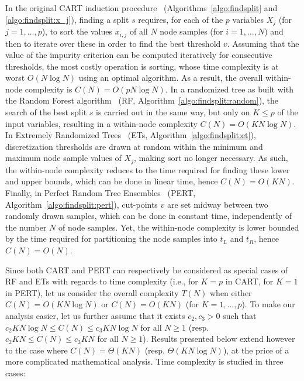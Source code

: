 In the original CART induction procedure~\citep{breiman:1984}
(Algorithms~\ref{algo:findsplit} and \ref{algo:findsplit:x_j}), finding a split
$s$  requires, for each of the $p$ variables $X_j$ (for $j=1,\dots,p$), to sort
the values $x_{i,j}$ of all $N$ node samples (for $i=1,\dots,N$) and then to
iterate over these in order to find the best threshold $v$. Assuming that the
value of the impurity criterion can be computed iteratively for consecutive
thresholds, the most costly operation
is sorting, whose time complexity is at worst $O(N \log N)$ using an optimal algorithm. As a result, the
overall within-node complexity is $C(N) = O(p N \log N)$. In a randomized tree
as built with the Random Forest algorithm~\citep{breiman:2001} (RF,
Algorithm~\ref{algo:findsplit:random}), the search of the best split $s$ is
carried out in the same way, but only on $K \leq p$ of the input variables,
resulting in a within-node complexity $C(N) = O(K N \log N)$. In Extremely
Randomized Trees~\citep{geurts:2006} (ETs, Algorithm~\ref{algo:findsplit:et}),
discretization thresholds are drawn at random within the minimum and maximum
node sample values of $X_j$, making sort no longer necessary. As such, the
within-node complexity reduces to the time required for finding these lower and
upper bounds, which can be done in linear time, hence $C(N)=O(KN)$. Finally, in
Perfect Random Tree Ensembles~\citep{cutler:2001} (PERT,
Algorithm~\ref{algo:findsplit:pert}), cut-points $v$ are set midway between two
randomly drawn samples, which can be done in constant time, independently of
the number $N$ of node samples. Yet, the within-node complexity is lower
bounded by the time required for partitioning the node samples into ${t_L}$ and
${t_R}$, hence $C(N)=O(N)$.

Since both CART and PERT can respectively be considered as special cases of RF
and ETs with regards to time complexity (i.e., for $K=p$ in CART, for $K=1$ in
PERT), let us consider the overall complexity $T(N)$ when either $C(N)=O(KN\log
N)$ or $C(N)=O(KN)$ (for $K=1,\dots,p$). To make our analysis easier, let us
further assume that it exists $c_2, c_3 > 0$ such that $c_2 KN \log N \leq C(N)
\leq c_3 KN \log N$ for all $N \geq 1$ (resp. $c_2 KN \leq C(N) \leq c_3 KN$
for all $N \geq 1$). Results presented below extend however to the case where
$C(N) = \Theta(KN)$ (resp. $\Theta(KN\log N)$), at the price of a more
complicated mathematical analysis. Time complexity is studied in three cases:

